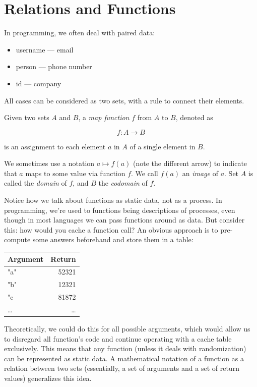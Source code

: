 \documentclass[12pt, a4paper, justified, notitlepage, sfsidenotes, notoc]{book}
\begin{document}
\section{Relations and Functions}
\label{sec:orgbe9e5dd}

In programming, we often deal with paired data:

\begin{itemize}
\item username — email
\item person — phone number
\item id — company
\end{itemize}

All cases can be considered as two sets, with a rule to connect their elements.

Given two sets \(A\) and \(B\), a \emph{map function} \(f\) from \(A\) to \(B\), denoted as

\begin{equation}
f: A \rightarrow B
\end{equation}

is an assignment  to each element \(a\) in \(A\) of a single element in \(B\).

We sometimes use a notation \(a \mapsto f(a)\) (note the different arrow) to indicate that \(a\) maps to some value via function \(f\). We call \(f(a)\) an \emph{image} of \(a\). Set \(A\) is called the \emph{domain} of \(f\), and \(B\) the \emph{codomain} of \(f\).

Notice how we talk about functions as static data, not as a process. In programming, we're used to functions being descriptions of processes, even though in most languages we can pass functions around as data. But consider this: how would you cache a function call? An obvious approach is to pre-compute some answers beforehand and store them in a table:

\begin{center}
\begin{tabular}{lr}
Argument & Return\\
\hline
"a" & 52321\\
"b" & 12321\\
"c & 81872\\
\ldots{} & \ldots{}\\
\end{tabular}
\end{center}

Theoretically, we could do this for all possible arguments, which would allow us to disregard all function's code and continue operating with a cache table exclusively. This means that any function (unless it deals with randomization) can be represented as static data. A mathematical notation of a function as a relation between two sets (essentially, a set of arguments and a set of return values) generalizes this idea.
\end{document}
